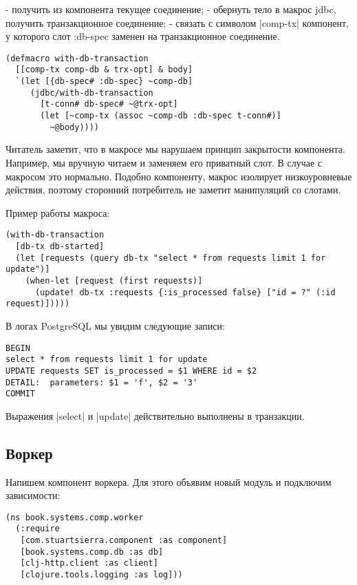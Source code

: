 - получить из компонента текущее соединение;
- обернуть тело в макрос jdbc, получить транзакционное соединение;
- связать с символом \spverb|comp-tx| компонент, у которого слот :db-spec заменен на
  транзакционное соединение.

\begin{verbatim}
(defmacro with-db-transaction
  [[comp-tx comp-db & trx-opt] & body]
  `(let [{db-spec# :db-spec} ~comp-db]
     (jdbc/with-db-transaction
       [t-conn# db-spec# ~@trx-opt]
       (let [~comp-tx (assoc ~comp-db :db-spec t-conn#)]
         ~@body))))
\end{verbatim}

Читатель заметит, что в макросе мы нарушаем принцип закрытости
компонента. Например, мы вручную читаем и заменяем его приватный слот. В случае
с макросом это нормально. Подобно компоненту, макрос изолирует низкоуровневые
действия, поэтому сторонний потребитель не заметит манипуляций со слотами.

Пример работы макроса:

\begin{verbatim}
(with-db-transaction
  [db-tx db-started]
  (let [requests (query db-tx "select * from requests limit 1 for update")]
    (when-let [request (first requests)]
      (update! db-tx :requests {:is_processed false} ["id = ?" (:id request)]))))
\end{verbatim}

В логах PostgreSQL мы увидим следующие записи:

\begin{verbatim}
BEGIN
select * from requests limit 1 for update
UPDATE requests SET is_processed = $1 WHERE id = $2
DETAIL:  parameters: $1 = 'f', $2 = '3'
COMMIT
\end{verbatim}

Выражения \spverb|select| и \spverb|update| действительно выполнены в транзакции.

\subsection{Воркер}

Напишем компонент воркера. Для этого объявим новый модуль и подключим
зависимости:

\begin{verbatim}
(ns book.systems.comp.worker
  (:require
   [com.stuartsierra.component :as component]
   [book.systems.comp.db :as db]
   [clj-http.client :as client]
   [clojure.tools.logging :as log]))
\end{verbatim}

